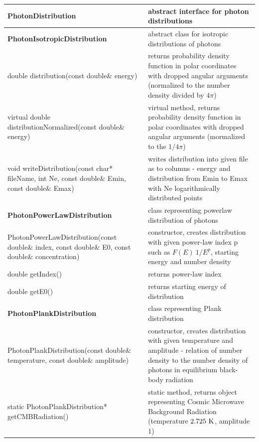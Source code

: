 \begin{small}
	\label{photonDistributionMethods}
	\begin{xtabular}{|p{0.45\textwidth}|p{0.55\textwidth}|}
				\hline
				\textbf{PhotonDistribution} & abstract interface for photon distributions\\
				\hline
				\textbf{PhotonIsotropicDistribution} & abstract class for isotropic distributions of photons\\
				\hline
				double distribution(const double\& energy) & returns probability density function in polar coordinates with dropped angular arguments (normalized to the number density divided by $4\pi$)\\
				\hline
				virtual double distributionNormalized(const double\& energy) & virtual method, returns probability density function in polar coordinates with dropped angular arguments (mormalized to the $1/4\pi$)\\
				\hline
				void writeDistribution(const char* fileName, int Ne, const double\& Emin, const double\& Emax) & writes distribution into given file as to columns - energy and distribution from Emin to Emax with Ne logarithmically distributed points\\
				\hline
				\textbf{PhotonPowerLawDistribution} & class representing powerlaw distribution of photons\\
				\hline
				PhotonPowerLawDistribution(const double\& index, const double\& E0, const double\& concentration) & constructor, creates distribution with given power-law index p such as $F(E)~1/E^p$, starting energy and number density \\
				\hline
				double getIndex() & returns power-law index\\
				\hline
				double getE0() & returns starting energy of distribution\\
				\hline
				\textbf{PhotonPlankDistribution} & class representing Plank distribution\\
				\hline
				PhotonPlankDistribution(const double\& temperature, const double\& amplitude) & constructor, creates distribution with given temperature and amplitude - relation of number density to the number density of photons in equilibrium black-body radiation\\
				\hline
				static PhotonPlankDistribution* getCMBRadiation() & static method, returns object representing Cosmic Microwave Background Radiation (temperature $2.725~\rm K$, amplitude $1$)\\

\end{xtabular}
\end{small}
